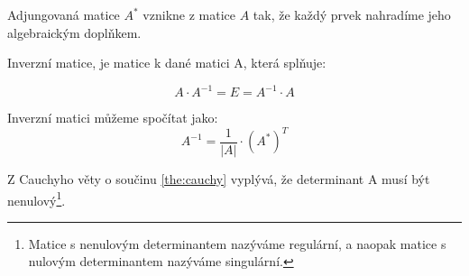 \begin{definition}
    Adjungovaná matice $A^*$ vznikne z matice $A$ tak, že každý prvek
    nahradíme jeho algebraickým doplňkem.
\end{definition}

\begin{definition}
    Inverzní matice, je matice k dané matici A, která splňuje:

    $$A \cdot A^{-1} = E = A^{-1} \cdot A$$

    Inverzní matici můžeme spočítat jako:
    $$A^{-1} = \frac{1}{|A|}\cdot (A^*)^{T}$$

    Z Cauchyho věty o součinu \ref{the:cauchy} vyplývá, že determinant A musí být nenulový\footnote{Matice s nenulovým determinantem
    nazýváme regulární, a naopak matice s nulovým determinantem nazýváme singulární.}.
\end{definition}

